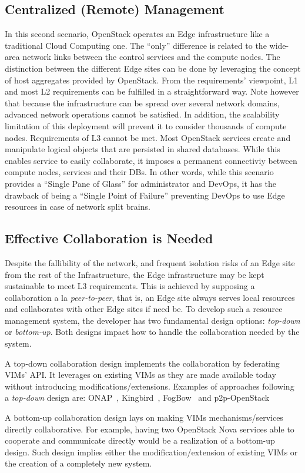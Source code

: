 \subsection{Centralized (Remote) Management}
\label{subsec:centralized_os}
In this second scenario, OpenStack operates an Edge infrastructure
like a traditional Cloud Computing one. The ``only'' difference is
related to the wide-area network links between the control services
and the compute nodes. The distinction between the different Edge
sites can be done by leveraging the concept of host aggregates
provided by OpenStack.
%
From the requirements' viewpoint, L1 and most L2 requirements can be
fulfilled in a straightforward way. Note however that because the
infrastructure can be spread over several network domains, advanced
network operations cannot be satisfied. In addition, the scalability
limitation of this deployment will prevent it to consider thousands of
compute nodes.
%
Requirements of L3 cannot be met. Most OpenStack services create and
manipulate logical objects that are persisted in shared databases.
While this enables service to easily collaborate, it imposes a
permanent connectiviy between compute nodes, services and their DBs.
In other words, while this scenario provides a ``Single Pane of
Glass'' for administrator and DevOps, it has the drawback of being a
``Single Point of Failure'' preventing DevOps to use Edge resources in
case of network split brains.

\subsection{Effective Collaboration is Needed}
Despite the fallibility of the network, and frequent isolation risks
of an Edge site from the rest of the Infrastructure, the Edge
infrastructure may be kept sustainable to meet L3 requirements. This
is achieved by supposing a collaboration a la \emph{peer-to-peer},
that is, an Edge site always serves local resources and collaborates
with other Edge sites if need be. To develop such a resource
management system, the developer has two fundamental design options:
\emph{top-down} or \emph{bottom-up}. Both designs impact how to handle
the collaboration needed by the system.

A top-down collaboration design implements the collaboration by
federating VIMs' API. It leverages on existing VIMs as they are made available today without introducing modifications/extensions. Examples of approaches following a \emph{top-down} design are: ONAP~\cite{onap}, Kingbird~\cite{kingbird}, FogBow~\cite{brasileiro2016fogbow} and p2p-OpenStack~\cite{ericsson-p2p}

A bottom-up collaboration design lays on making VIMs mechanisms/services directly collaborative. For example, having two OpenStack Nova services able to cooperate and communicate directly would be a realization of a bottom-up design. Such design implies either the modification/extension of existing VIMs or the creation of a completely new system.
